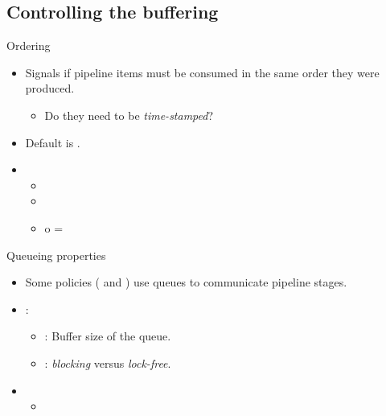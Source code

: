\subsection{Controlling the buffering}

\begin{frame}[t]{Ordering}
\begin{itemize}
  \item Signals if pipeline items must be consumed in the same order they were produced.
    \begin{itemize}
      \item Do they need to be \emph{time-stamped}?
    \end{itemize}

  \vfill
  \item Default is .

  \vfill
  \item {}
    \begin{itemize}
      \item {}
      \item {}
      \item {} o = 
    \end{itemize}
\end{itemize}
\end{frame}

\begin{frame}[t]{Queueing properties}
\begin{itemize}
  \item Some policies ( and ) use queues to
        communicate pipeline stages.

  \vfill
  \item {}:
    \begin{itemize}
      \item {}: Buffer size of the queue.
      \item {}: \emph{blocking} versus \emph{lock-free}.
    \end{itemize}

  \vfill
  \item {}
    \begin{itemize}
      \item {}
    \end{itemize}
\end{itemize}
\end{frame}
